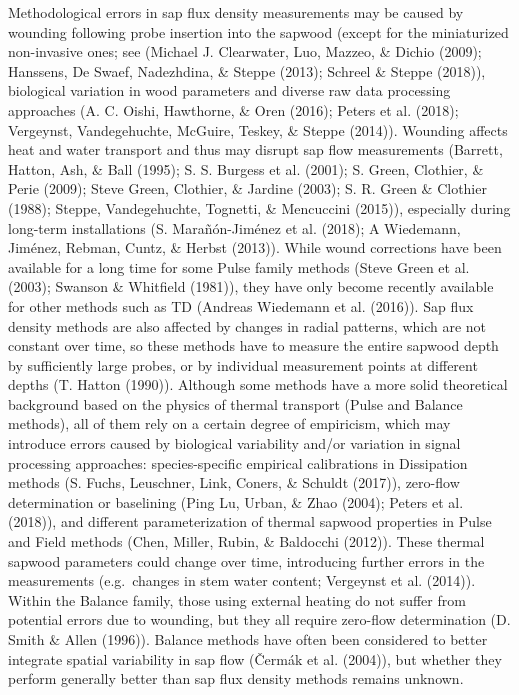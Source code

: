 \documentclass[11pt,twoside]{reedthesis}
\begin{document}
Methodological errors in sap flux density measurements may be caused by
wounding following probe insertion into the sapwood (except for the
miniaturized non-invasive ones; see (Michael J. Clearwater, Luo, Mazzeo,
\& Dichio (2009); Hanssens, De Swaef, Nadezhdina, \& Steppe (2013);
Schreel \& Steppe (2018)), biological variation in wood parameters and
diverse raw data processing approaches (A. C. Oishi, Hawthorne, \& Oren
(2016); Peters et al. (2018); Vergeynst, Vandegehuchte, McGuire, Teskey,
\& Steppe (2014)). Wounding affects heat and water transport and thus
may disrupt sap flow measurements (Barrett, Hatton, Ash, \& Ball (1995);
S. S. Burgess et al. (2001); S. Green, Clothier, \& Perie (2009); Steve
Green, Clothier, \& Jardine (2003); S. R. Green \& Clothier (1988);
Steppe, Vandegehuchte, Tognetti, \& Mencuccini (2015)), especially
during long-term installations (S. Marañón-Jiménez et al. (2018); A
Wiedemann, Jiménez, Rebman, Cuntz, \& Herbst (2013)). While wound
corrections have been available for a long time for some Pulse family
methods (Steve Green et al. (2003); Swanson \& Whitfield (1981)), they
have only become recently available for other methods such as TD
(Andreas Wiedemann et al. (2016)). Sap flux density methods are also
affected by changes in radial patterns, which are not constant over
time, so these methods have to measure the entire sapwood depth by
sufficiently large probes, or by individual measurement points at
different depths (T. Hatton (1990)). Although some methods have a more
solid theoretical background based on the physics of thermal transport
(Pulse and Balance methods), all of them rely on a certain degree of
empiricism, which may introduce errors caused by biological variability
and/or variation in signal processing approaches: species-specific
empirical calibrations in Dissipation methods (S. Fuchs, Leuschner,
Link, Coners, \& Schuldt (2017)), zero-flow determination or baselining
(Ping Lu, Urban, \& Zhao (2004); Peters et al. (2018)), and different
parameterization of thermal sapwood properties in Pulse and Field
methods (Chen, Miller, Rubin, \& Baldocchi (2012)). These thermal
sapwood parameters could change over time, introducing further errors in
the measurements (e.g.~changes in stem water content; Vergeynst et al.
(2014)). Within the Balance family, those using external heating do not
suffer from potential errors due to wounding, but they all require
zero-flow determination (D. Smith \& Allen (1996)). Balance methods have
often been considered to better integrate spatial variability in sap
flow (Čermák et al. (2004)), but whether they perform generally better
than sap flux density methods remains unknown.\par
\end{document}
